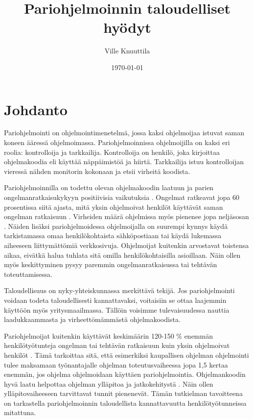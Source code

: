 \documentclass[finnish]{tktltiki2}
\title{Pariohjelmoinnin taloudelliset hyödyt}
\author{Ville Knuuttila}
\date{\today}
\theoremstyle{definition}
\theoremstyle{remark}
\begin{document}

\maketitle        %
\makeabstract     %

\tableofcontents  %
\newpage          %



\section{Johdanto}

Pariohjelmointi on ohjelmointimenetelmä, jossa kaksi ohjelmoijaa istuvat saman koneen ääressä ohjelmoimassa\cite{pairprogramming2}. Pariohjelmoinnissa ohjelmoijilla on kaksi eri roolia: kontrolloija ja tarkkailija. Kontrolloija on henkilö, joka kirjoittaa ohjelmakoodia eli käyttää näppäimistöä ja hiirtä. Tarkkailija istuu kontrolloijan vieressä nähden monitorin kokonaan ja etsii virheitä koodista. 


Pariohjelmoinnilla on todettu olevan ohjelmakoodin laatuun ja parien ongelmanratkaisukykyyn positiivisia vaikutuksia \cite{pairprogramming}. Ongelmat ratkeavat jopa 60 prosentissa siitä ajasta, mitä yksin ohjelmoivat henkilöt käyttävät saman ongelman ratkaisuun \cite{meta}. Virheiden määrä ohjelmissa myös pienenee jopa neljäsosan \cite{williams00str}. Näiden lisäksi pariohjelmoidessa ohjelmoijalla on suurempi kynnys käydä tarkistamassa omaa henkilökohtaista sähköpostiaan tai käydä lukemassa aiheeseen liittymättömiä verkkosivuja. \cite{williams03pair} Ohjelmoijat kuitenkin arvostavat toistensa aikaa, eivätkä halua tuhlata sitä omilla henkilökohtaisilla asioillaan. Näin ollen myös keskittyminen pysyy paremmin ongelmanratkaisussa tai tehtävän toteuttamisessa.

Taloudellisuus on nyky-yhteiskunnassa merkittävä tekijä. Jos pariohjelmointi voidaan todeta taloudellisesti kannattavaksi, voitaisiin se ottaa laajemmin käyttöön myös yritysmaailmassa. Tällöin voisimme tulevaisuudessa nauttia laadukkaammasta ja virheettömämmästä ohjelmakoodista.

Pariohjelmoijat kuitenkin käyttävät keskimäärin 120-150 \% enemmän henkilötyötunteja ongelman tai tehtävän ratkaisuun kuin yksin ohjelmoivat henkilöt \cite{williams01support}. Tämä tarkoittaa sitä, että esimerkiksi kaupallisen ohjelman ohjelmointi tulee maksamaan työnantajalle ohjelman toteutusvaiheessa jopa 1,5 kertaa enemmän, jos ohjelma ohjelmoidaan käyttäen pariohjelmointia. Ohjelmankoodin hyvä laatu helpottaa ohjelman ylläpitoa ja jatkokehitystä \cite{pearse95maintainability}. Näin ollen ylläpitovaiheeseen tarvittavat tunnit pienenevät. Tämän tutkielman tavoitteena on tarkastella pariohjelmoinnin taloudellista kannattavuutta henkilötyötunneissa mitattuna.
\end{document}
